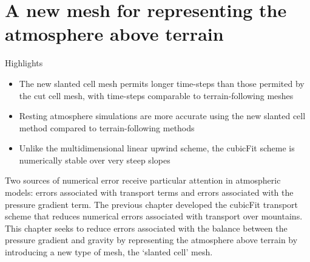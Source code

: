\chapter{A new mesh for representing the atmosphere above terrain}
\label{ch:slanted}

\begin{highlights}
{\Large Highlights}
\begin{itemize}
	\item The new slanted cell mesh permits longer time-steps than those permited by the cut cell mesh, with time-steps comparable to terrain-following meshes
	\item Resting atmosphere simulations are more accurate using the new slanted cell method compared to terrain-following methods
	\item Unlike the multidimensional linear upwind scheme, the cubicFit scheme is numerically stable over very steep slopes
\end{itemize}
\end{highlights}

Two sources of numerical error receive particular attention in atmospheric models: errors associated with transport terms and errors associated with the pressure gradient term.
The previous chapter developed the cubicFit transport scheme that reduces numerical errors associated with transport over mountains.
This chapter seeks to reduce errors associated with the balance between the pressure gradient and gravity by representing the atmosphere above terrain by introducing a new type of mesh, the `slanted cell' mesh.

